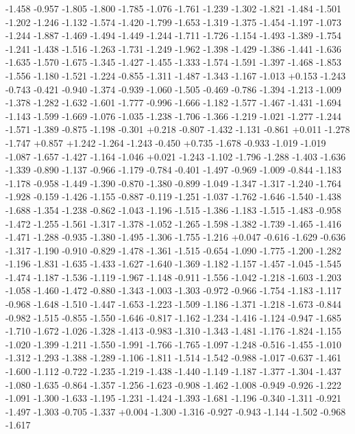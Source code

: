 \documentclass[9pt]{article}
\theoremstyle{plain}
\theoremstyle{definition}
\theoremstyle{remark}
\numberwithin{equation}{section}
\begin{document}
-1.458
-0.957
-1.805
-1.800
-1.785
-1.076
-1.761
-1.239
-1.302
-1.821
-1.484
-1.501
-1.202
-1.246
-1.132
-1.574
-1.420
-1.799
-1.653
-1.319
-1.375
-1.454
-1.197
-1.073
-1.244
-1.887
-1.469
-1.494
-1.449
-1.244
-1.711
-1.726
-1.154
-1.493
-1.389
-1.754
-1.241
-1.438
-1.516
-1.263
-1.731
-1.249
-1.962
-1.398
-1.429
-1.386
-1.441
-1.636
-1.635
-1.570
-1.675
-1.345
-1.427
-1.455
-1.333
-1.574
-1.591
-1.397
-1.468
-1.853
-1.556
-1.180
-1.521
-1.224
-0.855
-1.311
-1.487
-1.343
-1.167
-1.013
+0.153
-1.243
-0.743
-0.421
-0.940
-1.374
-0.939
-1.060
-1.505
-0.469
-0.786
-1.394
-1.213
-1.009
-1.378
-1.282
-1.632
-1.601
-1.777
-0.996
-1.666
-1.182
-1.577
-1.467
-1.431
-1.694
-1.143
-1.599
-1.669
-1.076
-1.035
-1.238
-1.706
-1.366
-1.219
-1.021
-1.277
-1.244
-1.571
-1.389
-0.875
-1.198
-0.301
+0.218
-0.807
-1.432
-1.131
-0.861
+0.011
-1.278
-1.747
+0.857
+1.242
-1.264
-1.243
-0.450
+0.735
-1.678
-0.933
-1.019
-1.019
-1.087
-1.657
-1.427
-1.164
-1.046
+0.021
-1.243
-1.102
-1.796
-1.288
-1.403
-1.636
-1.339
-0.890
-1.137
-0.966
-1.179
-0.784
-0.401
-1.497
-0.969
-1.009
-0.844
-1.183
-1.178
-0.958
-1.449
-1.390
-0.870
-1.380
-0.899
-1.049
-1.347
-1.317
-1.240
-1.764
-1.928
-0.159
-1.426
-1.155
-0.887
-0.119
-1.251
-1.037
-1.762
-1.646
-1.540
-1.438
-1.688
-1.354
-1.238
-0.862
-1.043
-1.196
-1.515
-1.386
-1.183
-1.515
-1.483
-0.958
-1.472
-1.255
-1.561
-1.317
-1.378
-1.052
-1.265
-1.598
-1.382
-1.739
-1.465
-1.416
-1.471
-1.288
-0.935
-1.380
-1.495
-1.306
-1.755
-1.216
+0.047
-0.616
-1.629
-0.636
-1.317
-1.190
-0.910
-0.829
-1.478
-1.361
-1.515
-0.654
-1.090
-1.775
-1.200
-1.282
-1.196
-1.831
-1.635
-1.433
-1.627
-1.640
-1.369
-1.182
-1.157
-1.457
-1.045
-1.545
-1.474
-1.187
-1.536
-1.119
-1.967
-1.148
-0.911
-1.556
-1.042
-1.218
-1.603
-1.203
-1.058
-1.460
-1.472
-0.880
-1.343
-1.003
-1.303
-0.972
-0.966
-1.754
-1.183
-1.117
-0.968
-1.648
-1.510
-1.447
-1.653
-1.223
-1.509
-1.186
-1.371
-1.218
-1.673
-0.844
-0.982
-1.515
-0.855
-1.550
-1.646
-0.817
-1.162
-1.234
-1.416
-1.124
-0.947
-1.685
-1.710
-1.672
-1.026
-1.328
-1.413
-0.983
-1.310
-1.343
-1.481
-1.176
-1.824
-1.155
-1.020
-1.399
-1.211
-1.550
-1.991
-1.766
-1.765
-1.097
-1.248
-0.516
-1.455
-1.010
-1.312
-1.293
-1.388
-1.289
-1.106
-1.811
-1.514
-1.542
-0.988
-1.017
-0.637
-1.461
-1.600
-1.112
-0.722
-1.235
-1.219
-1.438
-1.440
-1.149
-1.187
-1.377
-1.304
-1.437
-1.080
-1.635
-0.864
-1.357
-1.256
-1.623
-0.908
-1.462
-1.008
-0.949
-0.926
-1.222
-1.091
-1.300
-1.633
-1.195
-1.231
-1.424
-1.393
-1.681
-1.196
-0.340
-1.311
-0.921
-1.497
-1.303
-0.705
-1.337
+0.004
-1.300
-1.316
-0.927
-0.943
-1.144
-1.502
-0.968
-1.617
\end{document}
